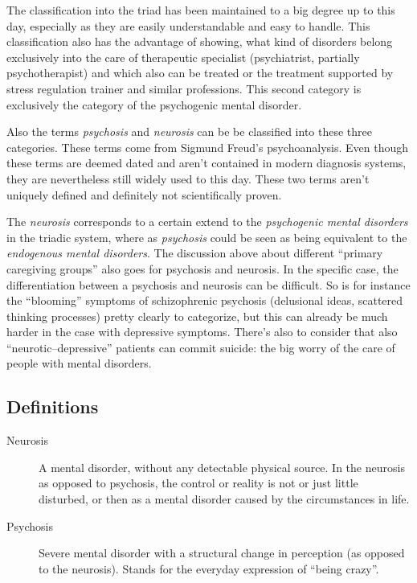 \documentclass[../main.tex]{subfiles}
\begin{document}
The classification into the triad has been maintained to a big degree up to this day, especially as they are easily understandable and 
easy to handle.
This classification also has the advantage of showing, what kind of disorders belong exclusively into the care of therapeutic
specialist (psychiatrist, partially psychotherapist) and which also can be treated or
the treatment supported by stress regulation trainer and similar professions.
This second category is exclusively the category of the psychogenic mental disorder.

Also the terms \emph{psychosis} and \emph{neurosis} can be be classified into these three categories.
These terms come from Sigmund Freud's psychoanalysis.
Even though these terms are deemed dated and aren't contained in modern diagnosis systems, they are nevertheless still widely used to this day.
These two terms aren't uniquely defined and definitely not scientifically proven.

The \emph{neurosis} corresponds to a certain extend to the \emph{psychogenic mental disorders} in the triadic system,
where as \emph{psychosis} could be seen as being equivalent to the \emph{endogenous mental disorders}.
The discussion above about different ``primary caregiving groups'' also goes for psychosis and neurosis.
In the specific case, the differentiation between a psychosis and neurosis can be difficult.
So is for instance the ``blooming'' symptoms of schizophrenic psychosis (delusional ideas, scattered thinking processes) pretty clearly to categorize,
but this can already be much harder in the case with depressive symptoms.
There's also to consider that also ``neurotic--depressive'' patients can commit suicide: the big worry of the care of people with mental disorders.

\subsection{Definitions}

\begin{description}
\item[Neurosis] A mental disorder, without any detectable physical source.
  In the neurosis as opposed to psychosis, the control or reality is not or just little disturbed,
  or then as a mental disorder caused by the circumstances in life.
\item[Psychosis] Severe mental disorder with a structural change in perception (as opposed to the neurosis).
  Stands for the everyday expression of ``being crazy''.
\end{description}
\end{document}
